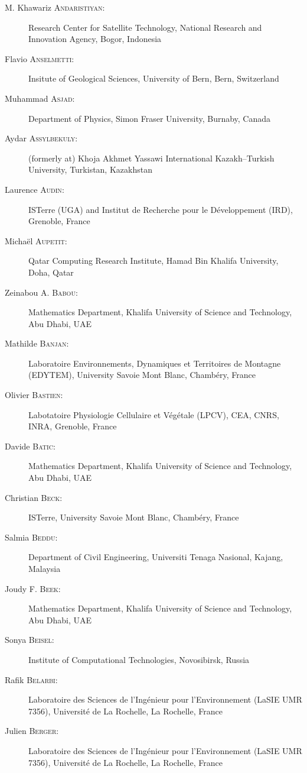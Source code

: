 \documentclass[final, a4paper, oneside, 12pt]{article}
\numberwithin{equation}{section}
\begin{document}
\begin{description}
  \item[M. Khawariz \textsc{Andaristiyan}:] Research Center for Satellite Technology, National Research and Innovation Agency, Bogor, Indonesia
  \item[Flavio \textsc{Anselmetti}:] Insitute of Geological Sciences, University of Bern, Bern, Switzerland
  \item[Muhammad \textsc{Asjad}:] Department of Physics, Simon Fraser University, Burnaby, Canada
  \item[Aydar \textsc{Assylbekuly}:] (formerly at) Khoja Akhmet Yassawi International Kazakh--Turkish University, Turkistan, Kazakhstan
  \item[Laurence \textsc{Audin}:] ISTerre (UGA) and Institut de Recherche pour le D\'eveloppement (IRD), Grenoble, France
  \item[Micha\"el \textsc{Aupetit}:] Qatar Computing Research Institute, Hamad Bin Khalifa University, Doha, Qatar
  \item[Zeinabou A. \textsc{Babou}:] Mathematics Department, Khalifa University of Science and Technology, Abu Dhabi, UAE
  \item[Mathilde \textsc{Banjan}:] Laboratoire Environnements, Dynamiques et Territoires de Montagne (EDYTEM), University Savoie Mont Blanc, Chamb\'ery, France
  \item[Olivier \textsc{Bastien}:] Labotatoire Physiologie Cellulaire et V\'eg\'etale (LPCV), CEA, CNRS, INRA, Grenoble, France
  \item[Davide \textsc{Batic}:] Mathematics Department, Khalifa University of Science and Technology, Abu Dhabi, UAE
  \item[Christian \textsc{Beck}:] ISTerre, University Savoie Mont Blanc, Chamb\'ery, France
  \item[Salmia \textsc{Beddu}:] Department of Civil Engineering, Universiti Tenaga Nasional, Kajang, Malaysia
  \item[Joudy F. \textsc{Beek}:] Mathematics Department, Khalifa University of Science and Technology, Abu Dhabi, UAE
  \item[Sonya \textsc{Beisel}:] Institute of Computational Technologies, Novosibirsk, Russia
  \item[Rafik \textsc{Belarbi}:] Laboratoire des Sciences de l'Ing\'enieur pour l'Environnement (LaSIE UMR 7356), Universit\'e de La Rochelle, La Rochelle, France
  \item[Julien \textsc{Berger}:] Laboratoire des Sciences de l'Ing\'enieur pour l'Environnement (LaSIE UMR 7356), Universit\'e de La Rochelle, La Rochelle, France

\end{description}
\end{document}
